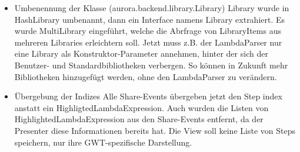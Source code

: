 \documentclass[parskip=full,11pt,twoside]{scrartcl}
\begin{document}
\begin{itemize}
    \item Umbenennung der Klasse (aurora.backend.library.Library)
    \newline
     Library wurde in HashLibrary umbenannt, dann ein Interface namens Library extrahiert.
Es wurde MultiLibrary eingeführt, welche die Abrfrage von LibraryItems aus mehreren Libraries erleichtern soll.
Jetzt muss z.B. der LambdaParser nur eine Library als Konstruktor-Parameter annehmen, hinter der sich der Benutzer- und Standardbibliotheken verbergen.
So können in Zukunft mehr Bibliotheken hinzugefügt werden, ohne den LambdaParser zu verändern.
    \newline

    \item Übergebung der Indizes
    \newline
    Alle Share-Events übergeben jetzt den Step index anstatt ein HighligtedLambdaExpression. Auch wurden die Listen von HighlightedLambdaExpression aus den Share-Events entfernt, da der Presenter diese Informationen bereits hat. Die View soll keine Liste von Steps speichern, nur ihre GWT-spezifische Darstellung.


\end{itemize}
\end{document}
